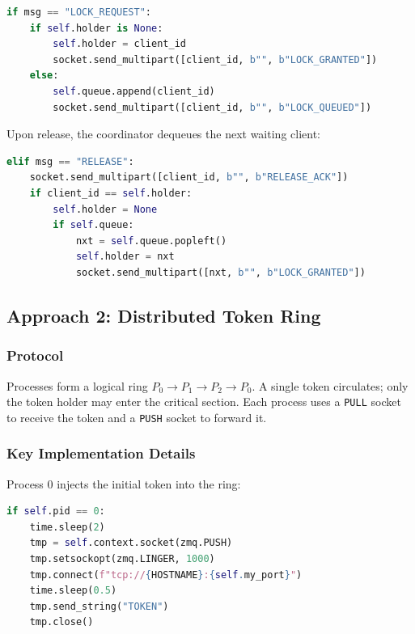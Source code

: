 \documentclass[12pt,a4paper]{article}
\begin{document}
\begin{lstlisting}[language=Python, caption={Coordinator lock management}]
if msg == "LOCK_REQUEST":
    if self.holder is None:
        self.holder = client_id
        socket.send_multipart([client_id, b"", b"LOCK_GRANTED"])
    else:
        self.queue.append(client_id)
        socket.send_multipart([client_id, b"", b"LOCK_QUEUED"])
\end{lstlisting}

Upon release, the coordinator dequeues the next waiting client:

\begin{lstlisting}[language=Python, caption={Coordinator release handling}]
elif msg == "RELEASE":
    socket.send_multipart([client_id, b"", b"RELEASE_ACK"])
    if client_id == self.holder:
        self.holder = None
        if self.queue:
            nxt = self.queue.popleft()
            self.holder = nxt
            socket.send_multipart([nxt, b"", b"LOCK_GRANTED"])
\end{lstlisting}

\subsection{Approach 2: Distributed Token Ring}

\subsubsection{Protocol}

Processes form a logical ring $P_0 \to P_1 \to P_2 \to P_0$. A single token circulates; only the token holder may enter the critical section. Each process uses a \texttt{PULL} socket to receive the token and a \texttt{PUSH} socket to forward it.

\subsubsection{Key Implementation Details}

Process 0 injects the initial token into the ring:

\begin{lstlisting}[language=Python, caption={Token creation by Process 0}]
if self.pid == 0:
    time.sleep(2)
    tmp = self.context.socket(zmq.PUSH)
    tmp.setsockopt(zmq.LINGER, 1000)
    tmp.connect(f"tcp://{HOSTNAME}:{self.my_port}")
    time.sleep(0.5)
    tmp.send_string("TOKEN")
    tmp.close()
\end{lstlisting}
\end{document}
